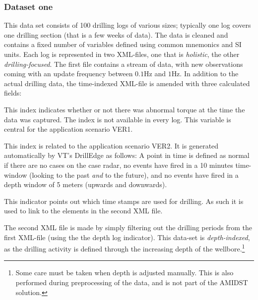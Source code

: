 \subsubsection{Dataset one}
This data set consists of 100 drilling logs of various sizes; typically one log covers one drilling section (that is  a few weeks of data). The data is cleaned and contains a fixed number of variables defined using  common mnemonics and SI units. Each log is represented in two XML-files, one that is  \textit{holistic}, the other  \textit{drilling-focused}. The first file contains a stream of data, with new observations coming with an update frequency between $0.1$Hz and $1$Hz. In addition to the actual drilling data, the time-indexed XML-file is amended with three calculated fields:
\bde
\item [Torque vibration index:] This index indicates whether or not there was abnormal torque at the time the data was captured. The index is not available in every log. This variable is central for the application scenario VER1.
\item [Normality index:] This index  is related to the application scenario VER2. It is generated automatically by VT's DrillEdge as follows:  A point in time is defined as normal if there are no cases on the case radar, no events have fired in a 10 minutes time-window (looking to the past \textit{and} to the future),  and no events have fired in a depth window of 5 meters (upwards and downwards).
\item [Depth-log indicator:] This indicator points out which time stamps are used for drilling. As such it is used to link to the elements in the second XML file. 
\ede

The second XML file is made by simply filtering out the drilling periods from the first XML-file (using the the depth log indicator). This data-set is \textit{depth-indexed}, as the drilling activity is defined through the increasing depth of the wellbore.\footnote{Some care must be taken when depth is adjusted manually. This is also performed during preprocessing of the data, and is not part of the AMIDST solution.}




